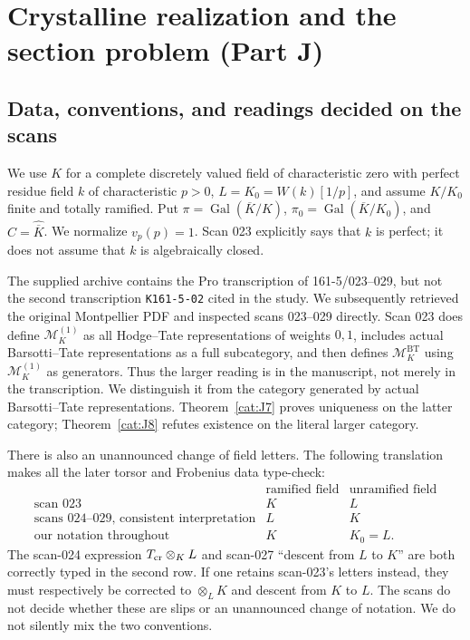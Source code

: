 \section{Crystalline realization and the section problem (Part J)}\label{sec:categoryJ}

\subsection{Data, conventions, and readings decided on the scans}
We use $K$ for a complete discretely valued field of characteristic zero
with perfect residue field $k$ of characteristic $p>0$,
$L=K_0=W(k)[1/p]$, and assume $K/K_0$ finite and totally ramified.
Put $\pi=\operatorname{Gal}(\overline K/K)$,
$\pi_0=\operatorname{Gal}(\overline K/K_0)$,
and $C=\widehat{\overline K}$.  We normalize $v_p(p)=1$.
Scan 023 explicitly says that $k$ is perfect; it does not assume that
$k$ is algebraically closed.

The supplied archive contains the Pro transcription of 161-5/023--029,
but not the second transcription \texttt{K161-5-02} cited in the study.
We subsequently retrieved the original Montpellier PDF and inspected
scans 023--029 directly.  Scan 023 does define
$\mathcal M_K^{(1)}$ as all Hodge--Tate representations of weights $0,1$,
includes actual Barsotti--Tate representations as a full subcategory,
and then defines $\mathcal M_K^{\mathrm{BT}}$ using
$\mathcal M_K^{(1)}$ as generators.  Thus the larger reading is in the
manuscript, not merely in the transcription.  We distinguish it from
the category generated by actual Barsotti--Tate representations.
Theorem~\ref{cat:J7} proves uniqueness on the latter category;
Theorem~\ref{cat:J8} refutes existence on the literal larger category.

There is also an unannounced change of field letters.  The following
translation makes all the later torsor and Frobenius data type-check:
\[
\begin{array}{c|cc}
 &\text{ramified field}&\text{unramified field}\\ \hline
 \text{scan 023}&K&L\\
 \text{scans 024--029, consistent interpretation}&L&K\\
 \text{our notation throughout}&K&K_0=L.
\end{array}
\]
The scan-024 expression $T_{\rm cr}\otimes_K L$ and scan-027
``descent from $L$ to $K$'' are both correctly typed in the second
row.  If one retains scan-023's letters instead, they must respectively
be corrected to $\otimes_LK$ and descent from $K$ to $L$.
The scans do not decide whether these are slips or an unannounced
change of notation.  We do not silently mix the two conventions.

